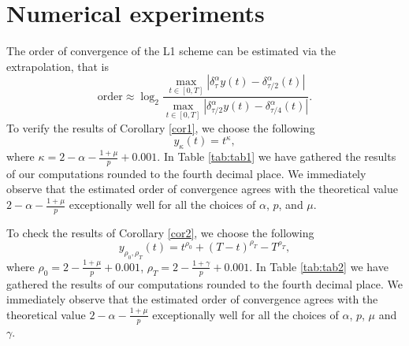 \documentclass[12pt,a4paper]{article}
\theoremstyle{definition}
\begin{document}
\section{Numerical experiments}

The order of convergence of the L1 scheme can be estimated via the extrapolation, that is
\begin{equation}
    \text{order} \approx \log_2\frac{\max_{t\in[0,T]}|\delta_\tau^\alpha y(t) - \delta_{\tau/2}^\alpha(t)|}{\max_{t\in[0,T]}|\delta_{\tau/2}^\alpha y(t) - \delta_{\tau/4}^\alpha(t)|}.
\end{equation}
To verify the results of Corollary \ref{cor1}, we choose the following
\begin{equation}\label{eq:test1}
    y_{\kappa}(t) = t^{\kappa},
\end{equation}
where $\kappa = 2 - \alpha - \frac{1+\mu}{p} + 0.001$. In Table \ref{tab:tab1} we have gathered the results of our computations rounded to the fourth decimal place. We immediately observe that the estimated order of convergence agrees with the theoretical value $2 - \alpha - \frac{1+\mu}{p} $ exceptionally well for all the choices of $\alpha$, $p$, and $\mu$.

To check the results of Corollary \ref{cor2}, we choose the following
\begin{equation}\label{eq:test2}
    y_{\rho_0, \rho_T }(t) = t^{\rho_0} + (T-t)^{\rho_T} - T^{\rho_T},
\end{equation}
where $\rho_0 = 2 - \frac{1+\mu}{p} + 0.001$, $\rho_T = 2 - \frac{1+\gamma}{p} + 0.001$. In Table \ref{tab:tab2} we have gathered the results of our computations rounded to the fourth decimal place. We immediately observe that the estimated order of convergence agrees with the theoretical value $2 - \alpha - \frac{1+\mu}{p}$ exceptionally well for all the choices of $\alpha$, $p$, $\mu$ and $\gamma$.
\end{document}
